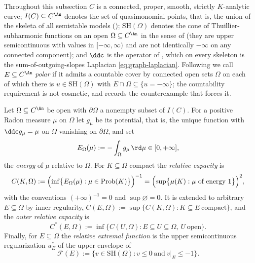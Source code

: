 Throughout this subsection \(C\) is a connected, proper, smooth, strictly
\(K\)-analytic curve; \(I(C)\subseteq C^{\An}\) denotes the set of
quasimonomial points, that is, the union of the skeleta of all semistable
models (); \(\mathrm{SH}(\Omega)\) denotes the
cone of Thuillier-subharmonic functions on an open \(\Omega\subseteq C^{\An}\)
in the sense of  (they are upper semicontinuous with
values in \([-\infty,\infty)\) and are not identically \(-\infty\) on any
connected component); and \(\ddc\) is the operator of
, which on every skeleton is the sum-of-outgoing-slopes
Laplacian \eqref{eq:graph-laplacian}.  Following \cite{Thu05} we call
\(E\subseteq C^{\An}\) \emph{polar} if it admits a countable cover by
connected open sets \(\Omega\) on each of which there is
\(u\in\mathrm{SH}(\Omega)\) with \(E\cap\Omega\subseteq\{u=-\infty\}\); the
countability requirement is not cosmetic, and
 records the counterexample that forces it.

\begin{definition}
\label{def:ch25-thuillier-capacity}
Let \(\Omega\subseteq C^{\An}\) be open with \(\partial\Omega\) a nonempty
subset of \(I(C)\).  For a positive Radon measure \(\mu\) on \(\Omega\) let
\(g_\mu\) be its potential, that is, the unique function with
\(\ddc g_\mu=\mu\) on \(\Omega\) vanishing on \(\partial\Omega\), and set
\[
 E_\Omega(\mu):=-\int_\Omega g_\mu\,\rd\mu\in[0,+\infty] ,
\]
the \emph{energy} of \(\mu\) relative to \(\Omega\).  For \(K\subseteq\Omega\)
compact the \emph{relative capacity} is
\begin{equation}
\label{eq:ch25-thuillier-capacity}
 C(K,\Omega):=\Bigl(\inf\bigl\{E_\Omega(\mu):
   \mu\in\operatorname{Prob}(K)\bigr\}\Bigr)^{-1}
 =\Bigl(\sup\bigl\{\mu(K):\mu\ \text{of energy}\ 1\bigr\}\Bigr)^{2},
\end{equation}
with the conventions \((+\infty)^{-1}=0\) and \(\sup\varnothing=0\).  It is
extended to arbitrary \(E\subseteq\Omega\) by inner regularity,
\(C(E,\Omega):=\sup\{C(K,\Omega):K\subseteq E\ \text{compact}\}\), and the
\emph{outer relative capacity} is
\begin{equation}
\label{eq:ch25-thuillier-outer}
 C^*(E,\Omega):=\inf\bigl\{C(U,\Omega):
    E\subseteq U\subseteq\Omega,\ U\ \text{open}\bigr\}.
\end{equation}
Finally, for \(E\subseteq\Omega\) the \emph{relative extremal function} is
the upper semicontinuous regularization \(u^*_E\) of the upper envelope of
\[
 \mathcal F(E):=\bigl\{v\in\mathrm{SH}(\Omega):v\leq0\ \text{and}\
    v|_E\leq-1\bigr\}.
\]
\end{definition}


